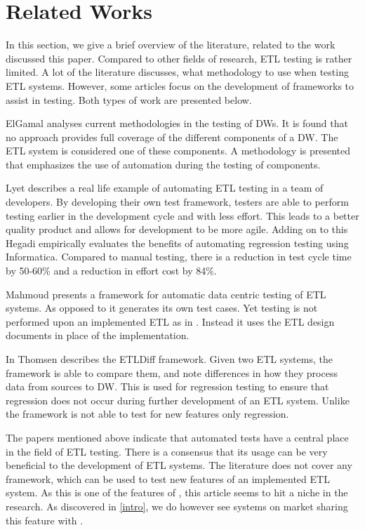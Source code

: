 \section{Related Works}
In this section, we give a brief overview of the literature, related to the work discussed this paper. Compared to other fields of research, ETL testing is rather limited. A lot of the literature discusses, what methodology to use when testing ETL systems. However, some articles focus on the development of frameworks to assist in testing. Both types of work are presented below.

ElGamal \cite{elgamal2012towards} analyses current methodologies in the testing of DWs. It is found that no approach provides full coverage of the different components of a DW. The ETL system is considered one of these components. A methodology is presented that emphasizes the use of automation during the testing of components.

Lyet \cite{subuiyer2014} describes a real life example of automating ETL testing in a team of developers. By developing their own test framework, testers are able to perform testing earlier in the development cycle and with less effort. This leads to a better quality product and allows for development to be more agile. Adding on to this Hegadi \cite{manjunath2012case} empirically evaluates the benefits of automating regression testing using Informatica. Compared to manual testing, there is a reduction in test cycle time by 50-60\% and a reduction in effort cost by 84\%.

Mahmoud \cite{dakroryautomated} presents a framework for automatic data centric testing of ETL systems. As opposed to \FW{} it generates its own test cases. Yet testing is not performed upon an implemented ETL as in \FW{}. Instead it uses the ETL design documents in place of the implementation.

In \cite{thomsen2006etldiff} Thomsen describes the ETLDiff framework. Given two ETL systems, the framework is able to compare them, and note differences in how they process data from sources to DW. This is used for regression testing to ensure that regression does not occur during further development of an ETL system. Unlike \FW the framework is not able to test for new features only regression.

The papers mentioned above indicate that automated tests have a central place in the field of ETL testing. There is a consensus that its usage can be very beneficial to the development of ETL systems. The literature does not cover any framework, which can be used to test new features of an implemented ETL system. As this is one of the features of \FW{}, this article seems to hit a niche in the research. As discovered in \cref{intro}, we do however see systems on market sharing this feature with \FW{}.
